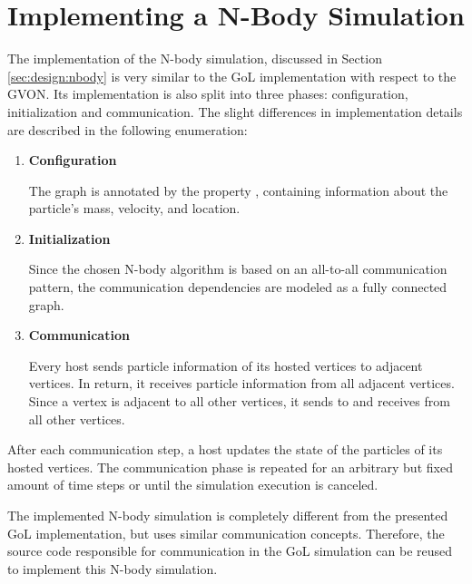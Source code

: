 \section{Implementing a N-Body Simulation}
\label{sec:impl:nbody}


The implementation of the N-body simulation, discussed in Section
\ref{sec:design:nbody} is very similar to the GoL
implementation with respect to the GVON. Its implementation is
also split into three phases: configuration, initialization and
communication. The slight differences in implementation details are
described in the following enumeration:

\begin{enumerate}
\item \textbf{Configuration}

  The graph is annotated by the property , containing
  information about the particle's mass, velocity, and location.

\item \textbf{Initialization}

  Since the chosen N-body algorithm is
  based on an all-to-all communication pattern, the communication
  dependencies are modeled as a fully connected graph.

\item \textbf{Communication}

  Every host sends particle information
  of its hosted vertices to adjacent vertices. In return, it receives
  particle information from all adjacent vertices. Since a vertex is
  adjacent to all other vertices, it sends to and receives from
  all other vertices.
\end{enumerate}

\noindent After each communication step, a host updates the state of
the particles of its hosted vertices.  The communication phase is
repeated for an arbitrary but fixed amount of time steps or until the simulation
execution is canceled.

The implemented N-body simulation is completely different from the
presented GoL implementation, but uses similar communication
concepts. Therefore, the source code responsible for communication in
the GoL simulation can be reused to implement this N-body simulation.



